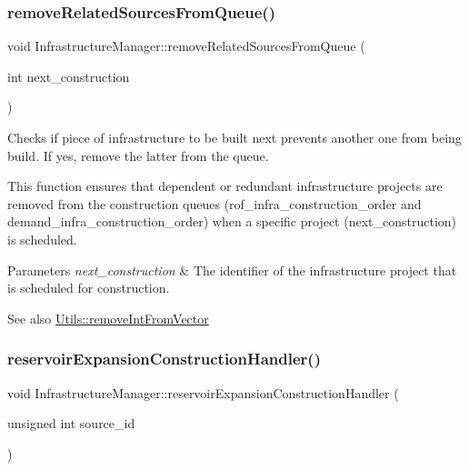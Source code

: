 \subsubsection{\texorpdfstring{remove\+Related\+Sources\+From\+Queue()}{removeRelatedSourcesFromQueue()}}
{\footnotesize\ttfamily void Infrastructure\+Manager\+::remove\+Related\+Sources\+From\+Queue (\begin{DoxyParamCaption}\item[{int}]{next\+\_\+construction }\end{DoxyParamCaption})}



Checks if piece of infrastructure to be built next prevents another one from being build. If yes, remove the latter from the queue. 

This function ensures that dependent or redundant infrastructure projects are removed from the construction queues ({\ttfamily rof\+\_\+infra\+\_\+construction\+\_\+order} and {\ttfamily demand\+\_\+infra\+\_\+construction\+\_\+order}) when a specific project ({\ttfamily next\+\_\+construction}) is scheduled.


\begin{DoxyParams}{Parameters}
{\em next\+\_\+construction} & The identifier of the infrastructure project that is scheduled for construction.\\
\hline
\end{DoxyParams}
\begin{DoxySeeAlso}{See also}
\mbox{\hyperlink{classUtils_a6022da71d614027a1da3a996531df85e}{Utils\+::remove\+Int\+From\+Vector}} 
\end{DoxySeeAlso}
\mbox{\label{classInfrastructureManager_ad4dc157110b29560cd47501ba67bcba3}} 
\subsubsection{\texorpdfstring{reservoir\+Expansion\+Construction\+Handler()}{reservoirExpansionConstructionHandler()}}
{\footnotesize\ttfamily void Infrastructure\+Manager\+::reservoir\+Expansion\+Construction\+Handler (\begin{DoxyParamCaption}\item[{unsigned int}]{source\+\_\+id }\end{DoxyParamCaption})}




